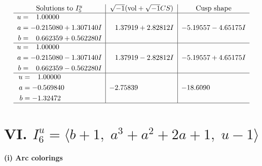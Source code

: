 \documentclass[1p]{elsarticle_modified}
\theoremstyle{definition}
\newcommand{\I}{\sqrt{-1}}
\begin{document}
$$\begin{array}{c|c|c}  
\text{Solutions to }I^u_{5}& \I (\text{vol} + \sqrt{-1}CS) & \text{Cusp shape}\\
 \hline 
\begin{aligned}
u &= \phantom{-}1.00000\phantom{ +0.000000I} \\
a &= -0.215080 + 1.307140 I \\
b &= \phantom{-}0.662359 + 0.562280 I\end{aligned}
 & \phantom{-}1.37919 + 2.82812 I & -5.19557 - 4.65175 I \\ \hline\begin{aligned}
u &= \phantom{-}1.00000\phantom{ +0.000000I} \\
a &= -0.215080 - 1.307140 I \\
b &= \phantom{-}0.662359 - 0.562280 I\end{aligned}
 & \phantom{-}1.37919 - 2.82812 I & -5.19557 + 4.65175 I \\ \hline\begin{aligned}
u &= \phantom{-}1.00000\phantom{ +0.000000I} \\
a &= -0.569840\phantom{ +0.000000I} \\
b &= -1.32472\phantom{ +0.000000I}\end{aligned}
 & -2.75839\phantom{ +0.000000I} & -18.6090\phantom{ +0.000000I}\\
 \hline 
 \end{array}$$\newpage\newpage\renewcommand{\arraystretch}{1}
\centering \section*{VI. $I^u_{6}= \langle b+1,\;a^3+a^2+2 a+1,\;u-1 \rangle$}
\flushleft \textbf{(i) Arc colorings}\\
\end{document}
